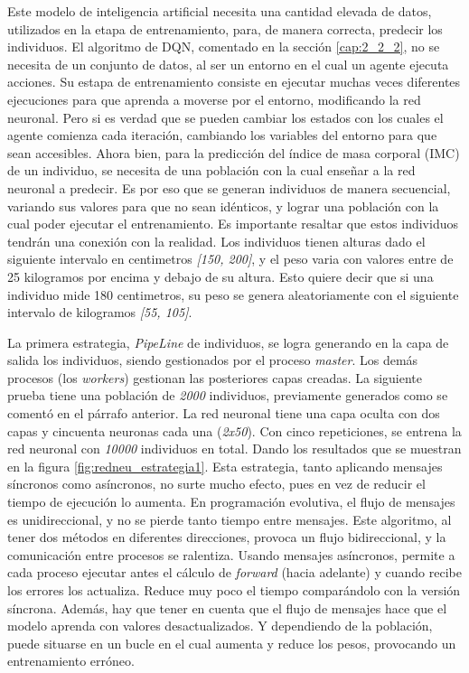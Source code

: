 	Este modelo de inteligencia artificial necesita una cantidad elevada de datos, utilizados en la etapa de entrenamiento, para, de manera correcta, predecir los individuos. El algoritmo de DQN, comentado en la sección \ref{cap:2_2_2}, no se necesita de un conjunto de datos, al ser un entorno en el cual un agente ejecuta acciones. Su estapa de entrenamiento consiste en ejecutar muchas veces diferentes ejecuciones para que aprenda a moverse por el entorno, modificando la red neuronal. Pero si es verdad que se pueden cambiar los estados con los cuales el agente comienza cada iteración, cambiando los variables del entorno para que sean accesibles. Ahora bien, para la predicción del índice de masa corporal (IMC) de un individuo, se necesita de una población con la cual enseñar a la red neuronal a predecir. Es por eso que se generan individuos de manera secuencial, variando sus valores para que no sean idénticos, y lograr una población con la cual poder ejecutar el entrenamiento. Es importante resaltar que estos individuos tendrán una conexión con la realidad. Los individuos tienen alturas dado el siguiente intervalo en centimetros \textit{[150, 200]}, y el peso varia con valores entre de 25 kilogramos por encima y debajo de su altura. Esto quiere decir que si una individuo mide 180 centimetros, su peso se genera aleatoriamente con el siguiente intervalo de kilogramos \textit{[55, 105]}.
		
	
		La primera estrategia, \textit{PipeLine} de individuos, se logra generando en la capa de salida los individuos, siendo gestionados por el proceso \textit{master}. Los demás procesos (los \textit{workers}) gestionan las posteriores capas creadas. La siguiente prueba tiene una población de \textit{2000} individuos, previamente generados como se comentó en el párrafo anterior. La red neuronal tiene una capa oculta con dos capas y cincuenta neuronas cada una (\textit{2x50}). Con cinco repeticiones, se entrena la red neuronal con \textit{10000} individuos en total. Dando los resultados que se muestran en la figura \ref{fig:redneu_estrategia1}. Esta estrategia, tanto aplicando mensajes síncronos como asíncronos, no surte mucho efecto, pues en vez de reducir el tiempo de ejecución lo aumenta. En programación evolutiva, el flujo de mensajes es unidireccional, y no se pierde tanto tiempo entre mensajes. Este algoritmo, al tener dos métodos en diferentes direcciones, provoca un flujo bidireccional, y la comunicación entre procesos se ralentiza. Usando mensajes asíncronos, permite a cada proceso ejecutar antes el cálculo de \textit{forward} (hacia adelante) y cuando recibe los errores los actualiza. Reduce muy poco el tiempo comparándolo con la versión síncrona. Además, hay que tener en cuenta que el flujo de mensajes hace que el modelo aprenda con valores desactualizados. Y dependiendo de la población, puede situarse en un bucle en el cual aumenta y reduce los pesos, provocando un entrenamiento erróneo.


